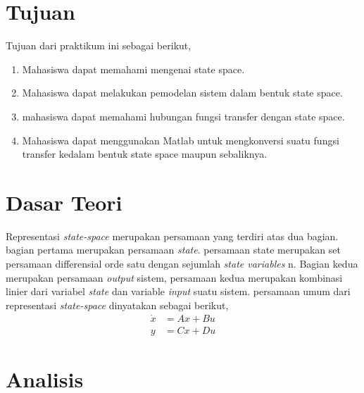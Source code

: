 \documentclass[../cover.tex]{subfiles}
\begin{document}
\section{Tujuan}
    Tujuan dari praktikum ini sebagai berikut,
    \begin{enumerate}
        \item Mahasiswa dapat memahami mengenai state space.
        \item Mahasiswa dapat melakukan pemodelan sistem dalam bentuk state space.
        \item mahasiswa dapat memahami hubungan fungsi transfer dengan state space.
        \item Mahasiswa dapat menggunakan Matlab untuk mengkonversi suatu fungsi transfer kedalam bentuk state space maupun sebaliknya.
    \end{enumerate}
\section{Dasar Teori}
    Representasi \textit{state-space} merupakan persamaan yang terdiri atas dua bagian. bagian pertama merupakan persamaan \textit{state}. persamaan state merupakan set persamaan differensial orde satu dengan sejumlah \textit{state variables} n. Bagian kedua merupakan persamaan \textit{output} sistem, persamaan kedua merupakan kombinasi linier dari variabel \textit{state} dan variable \textit{input} suatu sistem\cite{Fahmizal}. persamaan umum dari representasi \textit{state-space} dinyatakan sebagai berikut,
\begin{equation}
    \begin{split}
        \dot{x} &= Ax+Bu \\[5pt]
              y &= Cx + Du
    \end{split}
\end{equation}
\section{Analisis}
\end{document}
